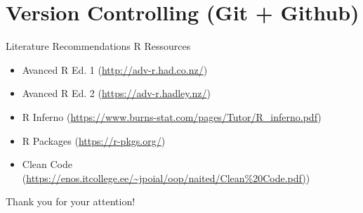 \documentclass[xcolor=table]{beamer}\usepackage[]{graphicx}\usepackage[]{color}
\begin{document}
\section{Version Controlling (Git + Github)}


\begin{frame}{Literature Recommendations}
R Ressources
\begin{itemize}
\item Avanced R Ed. 1 (\url{http://adv-r.had.co.nz/})
\item Avanced R Ed. 2 (\url{https://adv-r.hadley.nz/})
\item R Inferno (\url{https://www.burns-stat.com/pages/Tutor/R_inferno.pdf})
\item R Packages (\url{https://r-pkgs.org/})
\item Clean Code (\url{https://enos.itcollege.ee/~jpoial/oop/naited/Clean\%20Code.pdf)})
\end{itemize}

\end{frame}

\begin{frame}[plain]

\begin{center}
\Large Thank you for your attention!

\end{center}

\end{frame}
\end{document}
